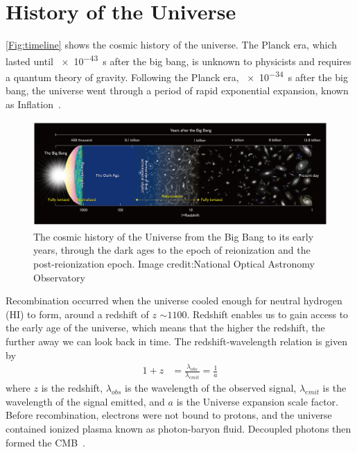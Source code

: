 \section{History of the Universe}

\autoref{Fig:timeline} shows the cosmic history of the universe. The Planck era, which lasted until \SI{e-43}{s} after the big bang, is unknown to physicists and requires a quantum theory of gravity. Following the Planck era, \SI{e-34}{s} after the big bang, the universe went through a period of rapid exponential expansion, known as Inflation~\citep{1981PhRvD..23..347G}.

\begin{figure}
	\begin{center}
		\includegraphics[width=\linewidth]{Figures/Reionizationtimeline.jpg}
		\caption{The cosmic history of the Universe from the Big Bang to its early years, through the dark ages to the epoch of reionization and the post-reionization epoch. Image credit:National Optical Astronomy Observatory}
		\label{Fig:timeline}
	\end{center}
\end{figure} 

Recombination occurred when the universe cooled enough for neutral hydrogen (HI) to form, around a redshift of $z$ $\sim1100$. Redshift enables us to gain access to the early age of the universe, which means that the higher the redshift, the further away we can look back in time. The redshift-wavelength relation is given by
\begin{equation}
\begin{split}
1+z & = \frac{\lambda_{obs}}{\lambda_{emit}}= \frac{1}{a}
\end{split}
\end{equation}
where $z$ is the redshift, $\lambda_{obs}$ is the wavelength of the observed signal, $\lambda_{emit}$ is the wavelength of the signal emitted, and $a$ is the Universe expansion scale factor. Before recombination, electrons were not bound to protons, and the universe contained ionized plasma known as photon-baryon fluid. Decoupled photons then formed the CMB~\citep{1965ApJ...142..419P}.

